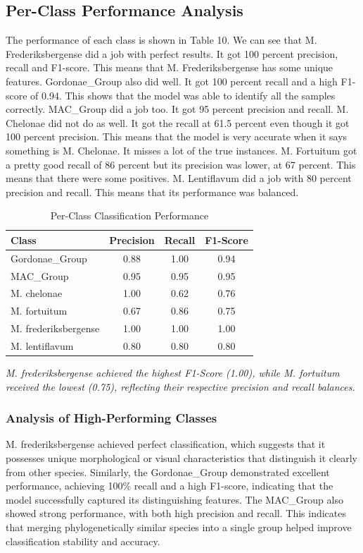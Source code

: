 \documentclass[journal,article,submit,pdftex,moreauthors]{Definitions/mdpi}
\begin{document}
\subsection{\textbf{Per-Class Performance Analysis}}
The performance of each class is shown in Table 10. We can see that M. Frederiksbergense did a job with perfect results. It got 100 percent precision, recall and F1-score. This means that M. Frederiksbergense has some unique features. Gordonae\_Group also did well. It got 100 percent recall and a high F1-score of 0.94. This shows that the model was able to identify all the samples correctly. MAC\_Group did a job too. It got 95 percent precision and recall. M. Chelonae did not do as well. It got the recall at 61.5 percent even though it got 100 percent precision. This means that the model is very accurate when it says something is M. Chelonae. It misses a lot of the true instances. M. Fortuitum got a pretty good recall of 86 percent but its precision was lower, at 67 percent. This means that there were some positives. M. Lentiflavum did a job with 80 percent precision and recall. This means that its performance was balanced.
\begin{table}[h]
	\centering
	\caption{ Per-Class Classification Performance}
	\begin{tabular}{|l|c|c|c|}
		\hline
		\textbf{Class} & \textbf{Precision} & \textbf{Recall} & \textbf{F1-Score} \\
		\hline
		Gordonae\_Group & 0.88 & 1.00 & 0.94 \\
		\hline
		MAC\_Group & 0.95 & 0.95 & 0.95 \\
		\hline
		M. chelonae & 1.00 & 0.62 & 0.76 \\
		\hline
		M. fortuitum & 0.67 & 0.86 & 0.75 \\
		\hline
		M. frederiksbergense & 1.00 & 1.00 & 1.00 \\
		\hline
		M. lentiflavum & 0.80 & 0.80 & 0.80 \\
		\hline
	\end{tabular}
	\label{tab:per_class_performance}
\end{table}

\emph{M. frederiksbergense achieved the highest F1-Score (1.00), while M. fortuitum received the lowest (0.75), reflecting their respective precision and recall balances.}


\subsubsection{\textbf{Analysis of High-Performing Classes}}
M. frederiksbergense achieved perfect classification, which suggests that it possesses unique morphological or visual characteristics that distinguish it clearly from other species. Similarly, the Gordonae\_Group demonstrated excellent performance, achieving 100\% recall and a high F1-score, indicating that the model successfully captured its distinguishing features. The MAC\_Group also showed strong performance, with both high precision and recall. This indicates that merging phylogenetically similar species into a single group helped improve classification stability and accuracy.
\end{document}
